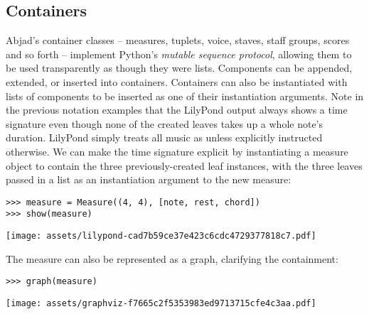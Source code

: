 \subsection{Containers}
\label{ssec:containers}

Abjad's container classes -- measures, tuplets, voice, staves, staff groups,
scores and so forth -- implement Python's \emph{mutable sequence protocol},
allowing them to be used transparently as though they were lists. Components
can be appended, extended, or inserted into containers. Containers can also be
instantiated with lists of components to be inserted as one of their
instantiation arguments. Note in the previous notation examples that the
LilyPond output always shows a  time signature even though none of
the created leaves takes up a whole note's duration. LilyPond simply treats all
music as  unless explicitly instructed otherwise. We can make the
 time signature explicit by instantiating a  measure
object to contain the three previously-created leaf instances, with the three
leaves passed in a list as an instantiation argument to the new measure:

\begin{comment}
<abjad>
measure = Measure((4, 4), [note, rest, chord])
show(measure)
</abjad>
\end{comment}

\begin{abjadbookoutput}
\begin{singlespacing}
\vspace{-0.5\baselineskip}
\begin{verbatim}
>>> measure = Measure((4, 4), [note, rest, chord])
>>> show(measure)
\end{verbatim}
\noindent\texttt{[image: assets/lilypond-cad7b59ce37e423c6cdc4729377818c7.pdf]}
\end{singlespacing}
\end{abjadbookoutput}

\noindent The measure can also be represented as a graph, clarifying the
containment:

\begin{comment}
<abjad>
graph(measure)
</abjad>
\end{comment}

\begin{abjadbookoutput}
\begin{singlespacing}
\vspace{-0.5\baselineskip}
\begin{verbatim}
>>> graph(measure)
\end{verbatim}
\noindent\texttt{[image: assets/graphviz-f7665c2f5353983ed9713715cfe4c3aa.pdf]}
\end{singlespacing}
\end{abjadbookoutput}


